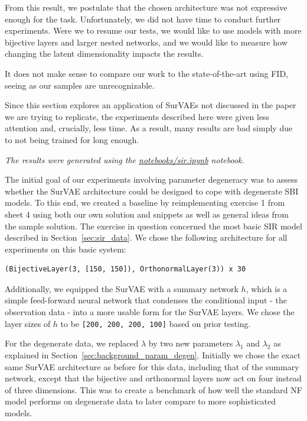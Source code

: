 From this result, we postulate that the chosen architecture was not expressive enough for the task. Unfortunately, we did not have time to conduct further experiments. Were we to resume our tests, we would like to use models with more bijective layers and larger nested networks, and we would like to measure how changing the latent dimensionality impacts the results.

It does not make sense to compare our work to the state-of-the-art using FID, seeing as our samples are unrecognizable.


\newpage
{}

Since this section explores an application of SurVAEs not discussed in the paper we are trying to replicate, the experiments described here were given less attention and, crucially, less time. As a result, many results are bad simply due to not being trained for long enough.

\label{sec:sbi}

\textit{The results were generated using the \href{https://github.com/xiaoxiae/GNNFinal2024/blob/main/notebooks/sir.ipynb}{notebooks/sir.ipynb} notebook.}

The initial goal of our experiments involving parameter degeneracy was to assess whether the SurVAE architecture could be designed to cope with degenerate SBI models. To this end, we created a baseline by reimplementing exercise 1 from sheet 4 using both our own solution and snippets as well as general ideas from the sample solution. The exercise in question concerned the most basic SIR model described in Section~\ref{sec:sir_data}. We chose the following architecture for all experiments on this basic system:

\begin{verbatim}
(BijectiveLayer(3, [150, 150]), OrthonormalLayer(3)) x 30
\end{verbatim}

Additionally, we equipped the SurVAE with a summary network $h$, which is a simple feed-forward neural network that condenses the conditional input - the observation data - into a more usable form for the SurVAE layers. We chose the layer sizes of $h$ to be \verb|[200, 200, 200, 100]| based on prior testing.

For the degenerate data, we replaced $\lambda$ by two new parameters $\lambda_1$ and $\lambda_2$ as explained in Section~\ref{sec:background_param_degen}. Initially we chose the exact same SurVAE architecture as before for this data, including that of the summary network, except that the bijective and orthonormal layers now act on four instead of three dimensions. This was to create a benchmark of how well the standard NF model performs on degenerate data to later compare to more sophisticated models.

